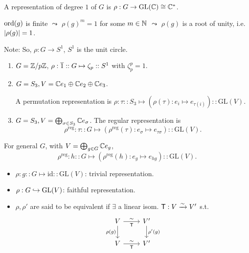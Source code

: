 \begin{example}
  A representation of degree $1$ of $G$ is $\rho: G \to \text{GL}(\mathbb{C})
  \cong \mathbb{C}^*$.

  $\operatorname{ord}(g)$ is finite $\leadsto$ $\rho(g)^m = 1$ for some $m \in \mathbb{N}$
  $\leadsto$ $\rho(g)$ is a root of unity, i.e. $\lvert\rho(g)\rvert = 1$.

  Note: So, $\rho: G \to S^1$, $S^1$ is the unit circle.

  \begin{enumerate}
    \item $G = {\mathbb{Z}}/{p\mathbb{Z}}$,
      $\rho: \overline{1} :: G \mapsto \zeta_p :: S^1$ with $\zeta_p^p = 1$.
    \item $G = S_3, V = \mathbb{C} e_1 \oplus \mathbb{C} e_2 \oplus \mathbb{C} e_3$.

      A permutation representation is
      $\rho: \tau :: S_3 \mapsto (\rho(\tau): e_i \mapsto e_{\tau(i)})
      :: \text{GL}(V)$.
      
    \item $G = S_3, V = \bigoplus_{\sigma \in S_3} \mathbb{C} e_{\sigma}$.
      The regular representation is
      \[ \rho^{\text{reg}}: \tau :: G \mapsto
      (\rho^{\text{reg}}(\tau): e_{\sigma} \mapsto e_{\tau \sigma})
      :: \text{GL}(V). \]
  \end{enumerate}
\end{example}

For general $G$, with $V = \bigoplus_{g\in G} \mathbb{C} e_g$,
\[ \rho^{\text{reg}}: h :: G \mapsto
  (\rho^{\text{reg}}(h): e_{g} \mapsto e_{hg})
:: \text{GL}(V). \]

\begin{definition} \mbox{}
  \begin{itemize}
    \item $\rho: g :: G \mapsto \text{id} :: \text{GL}(V)$:
      trivial representation.
    \item $\rho: G \hookrightarrow \text{GL}(V)$: faithful representation.
    \item $\rho, \rho'$ are said to be equivalent if $\exists$ a linear isom.
      ${\sf T}: V \xrightarrow{\sim} V'$ s.t.
      \[
        \begin{tikzcd}
          V \arrow[d, "\rho(g)"'] \arrow[r, "{\sf T}"', "\sim"] & V' \arrow[d, "\rho'(g)"] \\
          V \arrow[r, "{\sf T}"', "\sim"] & V'
        \end{tikzcd}
      \]
  \end{itemize}
\end{definition}

